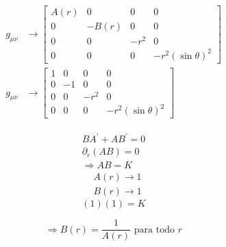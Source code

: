 \begin{equation}
    \begin{aligned}
        g_{\mu \nu} & \rightarrow\left[\begin{array}{cccc}
                                               A(r) & 0     & 0    & 0                   \\
                                               0    & -B(r) & 0    & 0                   \\
                                               0    & 0     & -r^2 & 0                   \\
                                               0    & 0     & 0    & -r^2(\sin \theta)^2
                                           \end{array}\right] \\
        g_{\mu \nu} & \rightarrow\left[\begin{array}{cccc}
                                               1 & 0  & 0    & 0                   \\
                                               0 & -1 & 0    & 0                   \\
                                               0 & 0  & -r^2 & 0                   \\
                                               0 & 0  & 0    & -r^2(\sin \theta)^2
                                           \end{array}\right]
    \end{aligned}
\end{equation}

\begin{equation}
    \begin{gathered}
        B A^{\prime}+A B^{\prime}=0 \\
        \partial_r(A B)=0 \\
        \Rightarrow A B=K
    \end{gathered}
\end{equation}
\begin{equation}
    \begin{aligned}
         & A(r) \rightarrow 1 \\
         & B(r) \rightarrow 1
    \end{aligned}
\end{equation}
\begin{equation}
    (1)(1)=K
\end{equation}

\begin{equation}
    \Rightarrow B(r)=\frac{1}{A(r)} \text { para todo } r
\end{equation}

